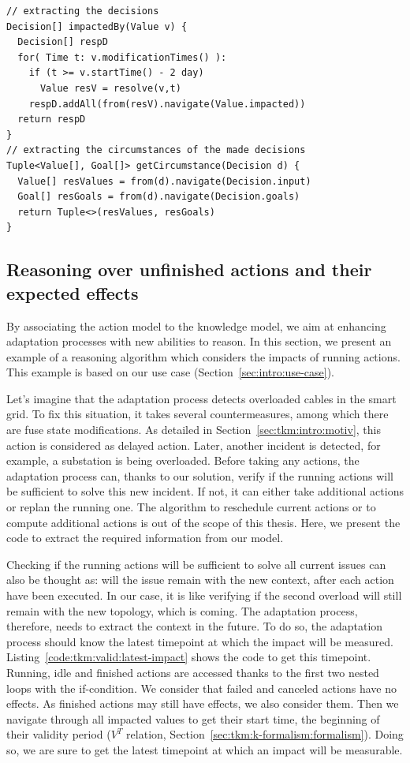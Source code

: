 \begin{lstlisting}[style=customc,caption=Get the goals used by the adaptation process from executed actions, label=code:actions-to-goals,basicstyle=\scriptsize]
// extracting the decisions
Decision[] impactedBy(Value v) {
  Decision[] respD
  for( Time t: v.modificationTimes() ):
    if (t >= v.startTime() - 2 day)
      Value resV = resolve(v,t)
    respD.addAll(from(resV).navigate(Value.impacted))
  return respD
}
// extracting the circumstances of the made decisions
Tuple<Value[], Goal[]> getCircumstance(Decision d) {
  Value[] resValues = from(d).navigate(Decision.input)
  Goal[] resGoals = from(d).navigate(Decision.goals)      
  return Tuple<>(resValues, resGoals)
} 
\end{lstlisting}

\subsection{Reasoning over unfinished actions and their expected effects}
By associating the action model to the knowledge model, we aim at enhancing adaptation processes with new abilities to reason.
In this section, we present an example of a reasoning algorithm which considers the impacts of running actions.
This example is based on our use case (\cf Section~\ref{sec:intro:use-case}).

Let's imagine that the adaptation process detects overloaded cables in the smart grid.
To fix this situation, it takes several countermeasures, among which there are fuse state modifications.
As detailed in Section~\ref{sec:tkm:intro:motiv}, this action is considered as delayed action.
Later, another incident is detected, for example, a substation is being overloaded.
Before taking any actions, the adaptation process can, thanks to our solution, verify if the running actions will be sufficient to solve this new incident.
If not, it can either take additional actions or replan the running one.
The algorithm to reschedule current actions or to compute additional actions is out of the scope of this thesis.
Here, we present the code to extract the required information from our model.

Checking if the running actions will be sufficient to solve all current issues can also be thought as: will the issue remain with the new context, \ie after each action have been executed.
In our case, it is like verifying if the second overload will still remain with the new topology, which is coming.
The adaptation process, therefore, needs to extract the context in the future.
To do so, the adaptation process should know the latest timepoint at which the impact will be measured.
Listing~\ref{code:tkm:valid:latest-impact} shows the code to get this timepoint.
Running, idle and finished actions are accessed thanks to the first two nested loops with the if-condition.
We consider that failed and canceled actions have no effects.
As finished actions may still have effects, we also consider them.
Then we navigate through all impacted values to get their start time, \ie the beginning of their validity period ($V^T$ relation, \cf Section~\ref{sec:tkm:k-formalism:formalism}).
Doing so, we are sure to get the latest timepoint at which an impact will be measurable.

